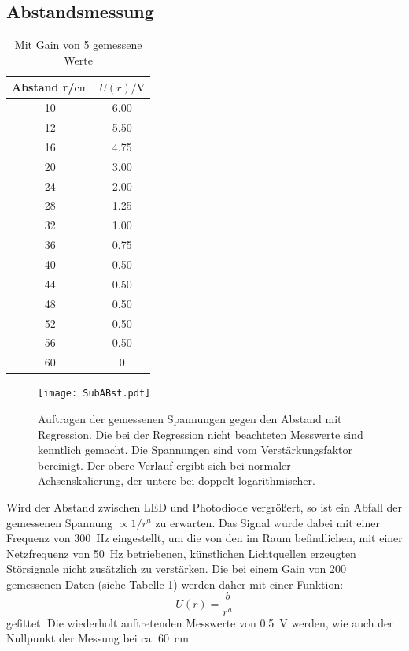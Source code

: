 \subsection{Abstandsmessung}
\label{chapter:Abst}
\begin{table}
  \centering
  \caption{Mit Gain von 5 gemessene Werte}
  \label{tab:2}
  \begin{tabular}{c c}
    \toprule
    Abstand r/$\si{\centi\metre}$ & $U(r)/\si{\volt}$\\
    \midrule
    10 & 6.00 \\
    12 & 5.50 \\
    16 & 4.75 \\
    20 & 3.00 \\
    24 & 2.00 \\
    28 & 1.25 \\
    32 & 1.00 \\
    36 & 0.75 \\
    40 & 0.50 \\
    44 & 0.50 \\
    48 & 0.50 \\
    52 & 0.50 \\
    56 & 0.50 \\
    60 & 0 \\
    \bottomrule
  \end{tabular}
\end{table}
\begin{figure}
  \centering
     \texttt{[image: SubABst.pdf]}
  \caption{Auftragen der gemessenen Spannungen gegen den Abstand mit Regression. Die bei der Regression nicht
  beachteten Messwerte sind kenntlich gemacht.
  Die Spannungen sind vom Verstärkungsfaktor bereinigt. Der obere Verlauf ergibt sich bei normaler Achsenskalierung,
  der untere bei doppelt logarithmischer.}
  \label{plot:2}
\end{figure}
Wird der Abstand zwischen LED und Photodiode vergrößert, so ist ein Abfall der gemessenen Spannung $\propto 1/r^a$ zu erwarten.
Das Signal wurde dabei mit einer Frequenz von \SI{300}{\hertz} eingestellt, um die von den im Raum
befindlichen, mit einer Netzfrequenz von \SI{50}{\hertz} betriebenen, künstlichen Lichtquellen erzeugten
Störsignale nicht zusätzlich zu verstärken. Die bei einem Gain von 200 gemessenen Daten
(siehe Tabelle \ref{tab:2}) werden daher mit einer Funktion:
\begin{equation}
  U(r) = \frac{b}{r^a}
\end{equation}
gefittet. Die wiederholt auftretenden Messwerte von \SI{0.5}{\volt} werden, wie auch der Nullpunkt der Messung bei ca. \SI{60}{\centi\metre}
